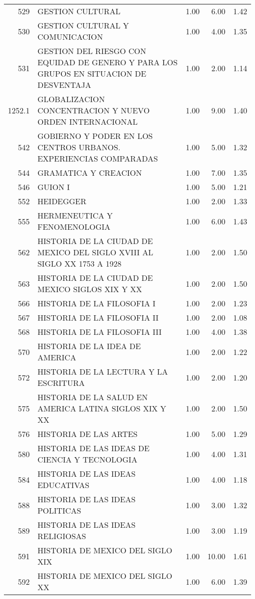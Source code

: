 \documentclass[12pt]{article}
\begin{document}
\begin{table}[ht]
\begin{tabular}{rlrrr}
  529 & GESTION CULTURAL & 1.00 & 6.00 & 1.42 \\ 
  530 & GESTION CULTURAL Y COMUNICACION & 1.00 & 4.00 & 1.35 \\ 
  531 & GESTION DEL RIESGO CON EQUIDAD DE GENERO Y PARA LOS GRUPOS EN SITUACION DE DESVENTAJA & 1.00 & 2.00 & 1.14 \\ 
  1252.1 & GLOBALIZACION CONCENTRACION Y NUEVO ORDEN INTERNACIONAL & 1.00 & 9.00 & 1.40 \\ 
  542 & GOBIERNO Y PODER EN LOS CENTROS URBANOS. EXPERIENCIAS COMPARADAS & 1.00 & 5.00 & 1.32 \\ 
  544 & GRAMATICA Y CREACION & 1.00 & 7.00 & 1.35 \\ 
  546 & GUION I & 1.00 & 5.00 & 1.21 \\ 
  552 & HEIDEGGER & 1.00 & 2.00 & 1.33 \\ 
  555 & HERMENEUTICA Y FENOMENOLOGIA & 1.00 & 6.00 & 1.43 \\ 
  562 & HISTORIA DE LA CIUDAD DE MEXICO DEL SIGLO XVIII AL SIGLO XX 1753 A 1928 & 1.00 & 2.00 & 1.50 \\ 
  563 & HISTORIA DE LA CIUDAD DE MEXICO SIGLOS XIX Y XX & 1.00 & 2.00 & 1.50 \\ 
  566 & HISTORIA DE LA FILOSOFIA I & 1.00 & 2.00 & 1.23 \\ 
  567 & HISTORIA DE LA FILOSOFIA II & 1.00 & 2.00 & 1.08 \\ 
  568 & HISTORIA DE LA FILOSOFIA III & 1.00 & 4.00 & 1.38 \\ 
  570 & HISTORIA DE LA IDEA DE AMERICA & 1.00 & 2.00 & 1.22 \\ 
  572 & HISTORIA DE LA LECTURA Y LA ESCRITURA & 1.00 & 2.00 & 1.20 \\ 
  575 & HISTORIA DE LA SALUD EN AMERICA LATINA SIGLOS XIX Y XX & 1.00 & 2.00 & 1.50 \\ 
  576 & HISTORIA DE LAS ARTES & 1.00 & 5.00 & 1.29 \\ 
  580 & HISTORIA DE LAS IDEAS DE CIENCIA Y TECNOLOGIA & 1.00 & 4.00 & 1.31 \\ 
  584 & HISTORIA DE LAS IDEAS EDUCATIVAS & 1.00 & 4.00 & 1.18 \\ 
  588 & HISTORIA DE LAS IDEAS POLITICAS & 1.00 & 3.00 & 1.32 \\ 
  589 & HISTORIA DE LAS IDEAS RELIGIOSAS & 1.00 & 3.00 & 1.19 \\ 
  591 & HISTORIA DE MEXICO DEL SIGLO XIX & 1.00 & 10.00 & 1.61 \\ 
  592 & HISTORIA DE MEXICO DEL SIGLO XX & 1.00 & 6.00 & 1.39 \\ 

\end{tabular}
\end{table}
\end{document}
